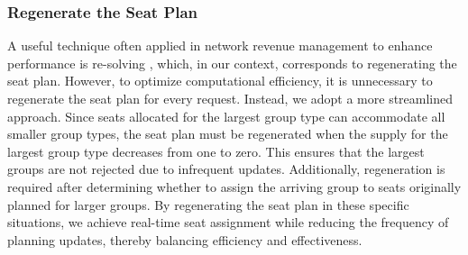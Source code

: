 


\subsubsection{Regenerate the Seat Plan}
A useful technique often applied in network revenue management to enhance performance is re-solving \citep{secomandi2008analysis, jasin2012re}, which, in our context, corresponds to regenerating the seat plan. However, to optimize computational efficiency, it is unnecessary to regenerate the seat plan for every request. Instead, we adopt a more streamlined approach. Since seats allocated for the largest group type can accommodate all smaller group types, the seat plan must be regenerated when the supply for the largest group type decreases from one to zero. This ensures that the largest groups are not rejected due to infrequent updates. Additionally, regeneration is required after determining whether to assign the arriving group to seats originally planned for larger groups. By regenerating the seat plan in these specific situations, we achieve real-time seat assignment while reducing the frequency of planning updates, thereby balancing efficiency and effectiveness.

